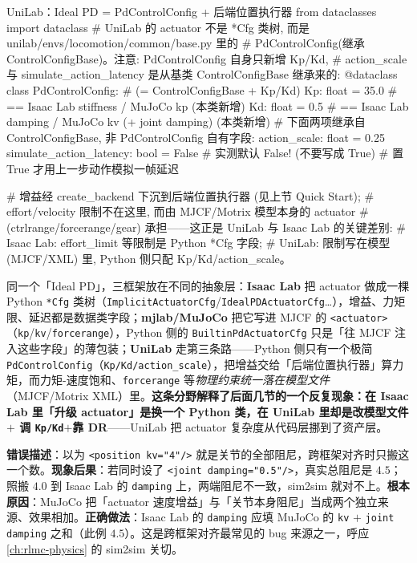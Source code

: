 \begin{codebox}[Python]{UniLab：Ideal PD = PdControlConfig + 后端位置执行器}
from dataclasses import dataclass
# UniLab 的 actuator 不是 *Cfg 类树, 而是 unilab/envs/locomotion/common/base.py 里的
# PdControlConfig(继承 ControlConfigBase)。注意: PdControlConfig 自身只新增 Kp/Kd,
# action_scale 与 simulate_action_latency 是从基类 ControlConfigBase 继承来的:
@dataclass
class PdControlConfig:                      # (= ControlConfigBase + Kp/Kd)
    Kp: float = 35.0          # == Isaac Lab stiffness / MuJoCo kp  (本类新增)
    Kd: float = 0.5           # == Isaac Lab damping  / MuJoCo kv (+ joint damping) (本类新增)
    # 下面两项继承自 ControlConfigBase, 非 PdControlConfig 自有字段:
    action_scale: float = 0.25
    simulate_action_latency: bool = False  # 实测默认 False! (不要写成 True)
                                           # 置 True 才用上一步动作模拟一帧延迟

# 增益经 create_backend 下沉到后端位置执行器 (见上节 Quick Start);
# effort/velocity 限制不在这里, 而由 MJCF/Motrix 模型本身的 actuator
# (ctrlrange/forcerange/gear) 承担——这正是 UniLab 与 Isaac Lab 的关键差别:
#   Isaac Lab: effort_limit 等限制是 Python *Cfg 字段;
#   UniLab:    限制写在模型 (MJCF/XML) 里, Python 侧只配 Kp/Kd/action_scale。
\end{codebox}

\begin{insight}\label{ins:rlmc-act-unilab-philosophy}
同一个「Ideal PD」，三框架放在不同的抽象层：\textbf{Isaac Lab} 把 actuator 做成一棵 Python \verb|*Cfg| 类树（\verb|ImplicitActuatorCfg|/\verb|IdealPDActuatorCfg|…），增益、力矩限、延迟都是数据类字段；\textbf{mjlab/MuJoCo} 把它写进 MJCF 的 \verb|<actuator>|（\verb|kp|/\verb|kv|/\verb|forcerange|），Python 侧的 \verb|BuiltinPdActuatorCfg| 只是「往 MJCF 注入这些字段」的薄包装；\textbf{UniLab} 走第三条路——Python 侧只有一个极简 \verb|PdControlConfig|（\verb|Kp/Kd/action_scale|），把增益交给「后端位置执行器」算力矩，而力矩-速度饱和、\verb|forcerange| 等\emph{物理约束统一落在模型文件}（MJCF/Motrix XML）里。\textbf{这条分野解释了后面几节的一个反复现象：在 Isaac Lab 里「升级 actuator」是换一个 Python 类，在 UniLab 里却是改模型文件 $+$ 调 \texttt{Kp/Kd}$+$靠 DR}——UniLab 把 actuator 复杂度从代码层挪到了资产层。
\end{insight}

\begin{pitfall}
\textbf{错误描述}：以为 \verb|<position kv="4"/>| 就是关节的全部阻尼，跨框架对齐时只搬这一个数。\textbf{现象后果}：若同时设了 \verb|<joint damping="0.5"/>|，真实总阻尼是 $4.5$；照搬 $4.0$ 到 Isaac Lab 的 \verb|damping| 上，两端阻尼不一致，sim2sim 就对不上。\textbf{根本原因}：MuJoCo 把「actuator 速度增益」与「关节本身阻尼」当成两个独立来源、效果相加。\textbf{正确做法}：Isaac Lab 的 \verb|damping| 应填 MuJoCo 的 \verb|kv| $+$ \verb|joint damping| 之和（此例 $4.5$）。这是跨框架对齐最常见的 bug 来源之一，呼应 \cref{ch:rlmc-physics} 的 sim2sim 关切。
\end{pitfall}

